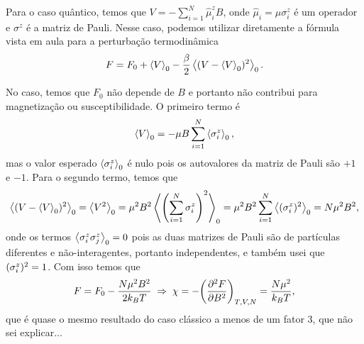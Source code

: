 \documentclass[a4paper,10pt]{article}
\begin{document}
\n\n

Para o caso quântico, temos que $V = - \sum_{i=1}^{N} \hat{\mu}_i^z B$, onde $\hat{\mu}_i = \mu \sigma_i^z$ é um operador e $\sigma^z$ é a matriz de Pauli. Nesse caso, podemos utilizar diretamente a fórmula vista em aula para a perturbação termodinâmica
$$
F = F_0 + \ev{V}_0 - \frac{\beta}{2} \ev{(V-\ev{V}_0)^2}_0.
$$

No caso, temos que $F_0$ não depende de $B$ e portanto não contribui para magnetização ou susceptibilidade. O primeiro termo é
$$
\ev{V}_0 = -\mu B \sum_{i=1}^{N} \ev{\sigma_i^z}_0,
$$
mas o valor esperado $\ev{\sigma_i^z}_0$ é nulo pois os autovalores da matriz de Pauli são $+1$ e $-1$. Para o segundo termo, temos que
$$
\ev{(V-\ev{V}_0)^2}_0 = \ev{V^2}_0 = \mu^2 B^2 \ev{\qty(\sum_{i=1}^N \sigma_i^z)^2}_0 = \mu^2 B^2 \sum_{i=1}^N \ev{(\sigma_i^z)^2}_0 = N \mu^2 B^2,
$$
onde os termos $\ev{\s_i^z \s_j^z}_0 = 0$ pois as duas matrizes de Pauli são de partículas diferentes e não-interagentes, portanto independentes, e também usei que $(\sigma_i^z)^2 = 1$. Com isso temos que
$$
F = F_0 - \frac{N \mu^2 B^2}{2 k_B T} \; \Rightarrow \; \chi = -\qty(\pdv[2]{F}{B})_{T,V,N} = \frac{N\mu^2}{k_B T},
$$
que é quase o mesmo resultado do caso clássico a menos de um fator $3$, que não sei explicar...
\end{document}
